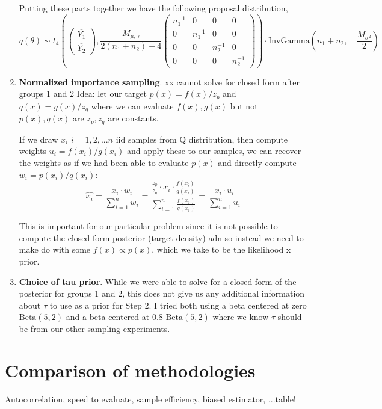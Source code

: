 \documentclass[12pt,letterpaper,twoside]{article}
\begin{document}
\begin{enumerate}[label=(\alph*)]
    Putting these parts together we have the following proposal distribution,
    $$ q(\theta) \sim t_4\left(\left(\begin{matrix*}
        \overline{Y_1}\\ \overline{Y_2} \end{matrix*}\right), \frac{M_{\mu, \gamma}}{2(n_1 + n_2) - 4}\left(\begin{matrix*}
        n_1^{-1} & 0 & 0 & 0 \\ 0 & n_1^{-1} & 0 & 0 \\ 0 & 0 & n_2^{-1} & 0 \\ 0 & 0 & 0 & n_2^{-1}
        \end{matrix*}\right)\right) \cdot \text{InvGamma}\left(n_1+n_2, \quad \frac{M_{\sigma^2}}{2} \right) $$

    \item \textbf{Normalized importance sampling}. xx cannot solve for closed form after groups 1 and 2
    Idea: let our target $p(x) = f(x) / z_p$ and $q(x) = g(x) / z_q$ where 
    we can evaluate $f(x), g(x)$ but not $p(x), q(x)$ are $z_p, z_q$ are 
    constants. \newline

    If we draw $x_i$ $i=1,2,...n$ iid samples from Q distribution, then compute 
    weights $u_i = f(x_i) / g(x_i)$ and apply these to our samples, we can 
    recover the weights as if we had been able to evaluate $p(x)$ and 
    directly compute $w_i = p(x_i) / q(x_i)$:
    $$ \hat{x_i} = \frac{x_i \cdot w_i}{\sum_{i=1}^n w_i} = \frac{\frac{z_p}{z_q} \cdot x_i \cdot \frac{f(x_i)}{g(x_i)}}{\sum_{i=1}^n \frac{f(x_i)}{g(x_i)}} = \frac{x_i \cdot u_i}{\sum_{i=1}^n u_i}$$

    This is important for our particular problem since it is not possible 
    to compute the closed form posterior (target density) adn so instead 
    we need to make do with some $f(x) \propto p(x)$, which we take to be
    the likelihood x prior.

    \item \textbf{Choice of tau prior}. While we were able to solve for a 
    closed form of the posterior for groups 1 and 2, this does not give us 
    any additional information about $\tau$ to use as a prior for Step 2. 
    I tried both using a beta centered at zero $\text{Beta}(5, 2)$ and a 
    beta centered at 0.8 $\text{Beta}(5, 2)$ where we know $\tau$ should 
    be from our other sampling experiments.  
\end{enumerate}


\section{Comparison of methodologies} Autocorrelation, speed to evaluate, sample efficiency,
 biased estimator, ...table!
 
\end{document}
